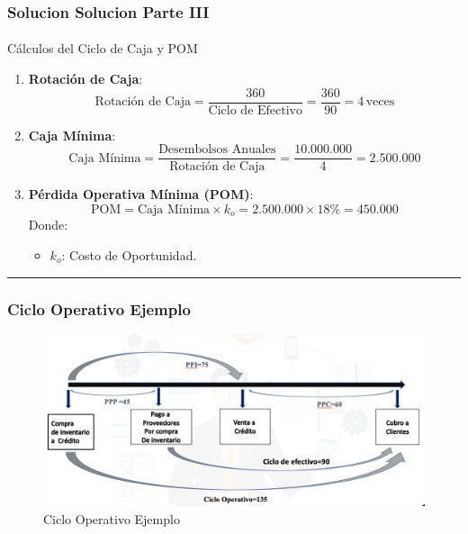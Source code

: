 \documentclass[
  letterpaper,
  DIV=11,
  numbers=noendperiod]{scrartcl}
\makeatletter
\let\oldparagraph\paragraph
\renewcommand{\paragraph}{
    \@ifstar
      \xxxParagraphStar
      \xxxParagraphNoStar
  }
\newcommand{\xxxParagraphStar}[1]{\oldparagraph*{#1}\mbox{}}
\newcommand{\xxxParagraphNoStar}[1]{\oldparagraph{#1}\mbox{}}
\providecommand{\tightlist}{%
  \setlength{\itemsep}{0pt}\setlength{\parskip}{0pt}}\usepackage{longtable,booktabs,array}
\makeatother
\begin{document}
\subsubsection{Solucion Solucion Parte
III}\label{solucion-solucion-parte-iii}

\paragraph{Cálculos del Ciclo de Caja y
POM}\label{cuxe1lculos-del-ciclo-de-caja-y-pom-1}

\begin{enumerate}
\def\labelenumi{\arabic{enumi}.}
\setcounter{enumi}{2}
\item
  \textbf{Rotación de Caja}: \[
  \text{Rotación de Caja} = \frac{360}{\text{Ciclo de Efectivo}} = \frac{360}{90} = 4 \, \text{veces}
  \]
\item
  \textbf{Caja Mínima}: \[
  \text{Caja Mínima} = \frac{\text{Desembolsos Anuales}}{\text{Rotación de Caja}} = \frac{10.000.000}{4} = 2.500.000
  \]
\item
  \textbf{Pérdida Operativa Mínima (POM)}: \[
  \text{POM} = \text{Caja Mínima} \times k_o = 2.500.000 \times 18\% = 450.000
  \] Donde:

  \begin{itemize}
  \tightlist
  \item
    \(k_o\): Costo de Oportunidad.
  \end{itemize}
\end{enumerate}

\begin{center}\rule{0.5\linewidth}{0.5pt}\end{center}

\subsubsection{Ciclo Operativo Ejemplo}\label{ciclo-operativo-ejemplo}

\begin{figure}[H]

{\centering \includegraphics{Imagen4.png}

}

\caption{Ciclo Operativo Ejemplo}

\end{figure}%
\end{document}
